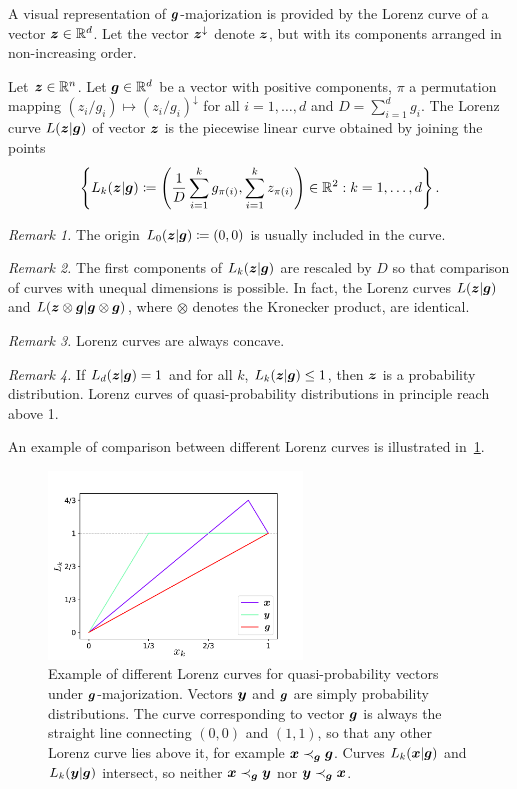 A visual representation of $\bm{g}$-majorization is provided by the Lorenz curve of a vector $\bm{z} \in \mathbb{R}^d$.
Let the vector $\bm{z}^\downarrow$ denote $\bm{z}$, but with its components arranged in non-increasing order.
\begin{definition}
    Let $\bm{z} \in \mathbb{R}^n$.
    Let $\bm{g} \in \mathbb{R}^d$ be a vector with positive components, $\pi$ a permutation mapping $(z_i/g_i) \mapsto (z_i/g_i)^\downarrow$ for all $i=1,\dots,d$ and $D = \sum_{i=1}^d g_i$.
    The Lorenz curve $L(\bm{z}|\bm{g})$ of vector $\bm{z}$ is the piecewise linear curve obtained by joining the points 
\begin{equation}\label{eq:lorenz}
    \left\{ L_k(\bm{z}|\bm{g}) \coloneqq \left( \frac{1}{D}\sum_{i=1}^k g_{\pi(i)}, \sum_{i=1}^k z_{\pi(i)} \right) \in \mathbb{R}^2: k = 1,\dots,d \right\}.
\end{equation}
\end{definition}
\emph{Remark 1.} The origin $L_0(\bm{z}|\bm{g}) \coloneqq (0,0)$ is usually included in the curve.

\emph{Remark 2.} The first components of $L_k(\bm{z}|\bm{g})$ are rescaled by $D$ so that comparison of curves with unequal dimensions is possible.
In fact, the Lorenz curves $L(\bm{z}|\bm{g})$ and $L(\bm{z} \otimes \bm{g}|\bm{g} \otimes \bm{g})$, where $\otimes$ denotes the Kronecker product, are identical.

\emph{Remark 3.} Lorenz curves are always concave.

\emph{Remark 4.} If $L_d(\bm{z}|\bm{g}) = 1$ and for all $k$, $L_k(\bm{z}|\bm{g}) \leq 1$, then $\bm{z}$ is a probability distribution.
Lorenz curves of quasi-probability distributions in principle reach above 1.

An example of comparison between different Lorenz curves is illustrated in~\cref{fig:lctoy}.
\begin{figure}
    \centering
    \includegraphics[height=5cm]{sections/major/lctoy.pdf}
    \caption{Example of different Lorenz curves for quasi-probability vectors under $\bm{g}$-majorization.
    Vectors $\bm{y}$ and $\bm{g}$ are simply probability distributions.
    The curve corresponding to vector $\bm{g}$ is always the straight line connecting $(0,0)$ and $(1,1)$, so that any other Lorenz curve lies above it, for example $\bm{x} \prec_{\bm{g}} \bm{g}$.
    Curves $L_k(\bm{x}|\bm{g})$ and $L_k(\bm{y}|\bm{g})$ intersect, so neither $\bm{x} \prec_{\bm{g}} \bm{y}$ nor $\bm{y} \prec_{\bm{g}} \bm{x}$.
    }
    \label{fig:lctoy}
\end{figure}

